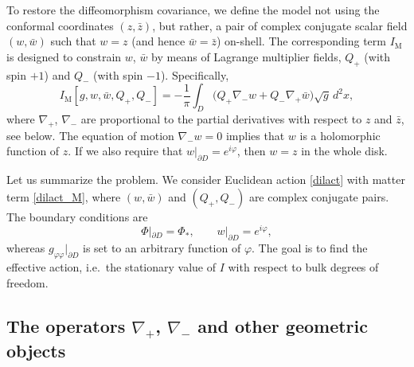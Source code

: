 \documentclass[12pt]{article}
\newcommand{\ph}{\varphi}
\newcommand{\Matter}{\mathrm{M}}
\def\ie{i.e.\ }
\begin{document}
To restore the diffeomorphism covariance, we define the model not using the conformal coordinates $(z,\bar{z})$, but rather, a pair of complex conjugate scalar field $(w,\bar{w})$ such that $w=z$ (and hence $\bar{w}=\bar{z}$) on-shell. The corresponding term $I_{\Matter}$ is designed to constrain $w$, $\bar{w}$ by means of Lagrange multiplier fields, $Q_{+}$ (with spin $+1$) and $Q_{-}$ (with spin $-1$). Specifically,
\begin{equation}\label{dilact_M}
I_{\Matter}[g,w,\bar{w},Q_{+},Q_{-}]
=-\frac{1}{\pi} \int_{D} \bigl(Q_{+}\nabla_{-}w+Q_{-}\nabla_{+}\bar{w}\bigr)
\sqrt{g}\,d^2x,
\end{equation}
where $\nabla_{+}$, $\nabla_{-}$ are proportional to the partial derivatives with respect to $z$ and $\bar{z}$, see below. The equation of motion $\nabla_{-}w=0$ implies that $w$ is a holomorphic function of $z$. If we also require that $w|_{\partial D}=e^{i\ph}$, then $w=z$ in the whole disk.

Let us summarize the problem. We consider Euclidean action \eqref{dilact} with matter term \eqref{dilact_M}, where $(w,\bar{w})$ and $(Q_{+},Q_{-})$ are complex conjugate pairs. The boundary conditions are
\begin{equation}\label{boundcond}
\Phi|_{\partial D}=\Phi_*,\qquad w|_{\partial D}=e^{i\ph},
\end{equation}
whereas $g_{\ph\ph}|_{\partial D}$ is set to an arbitrary function of $\ph$. The goal is to find the effective action, \ie the stationary value of $I$ with respect to bulk degrees of freedom.


\subsection{The operators $\nabla_{+}$, $\nabla_{-}$ and other geometric objects}
\end{document}
